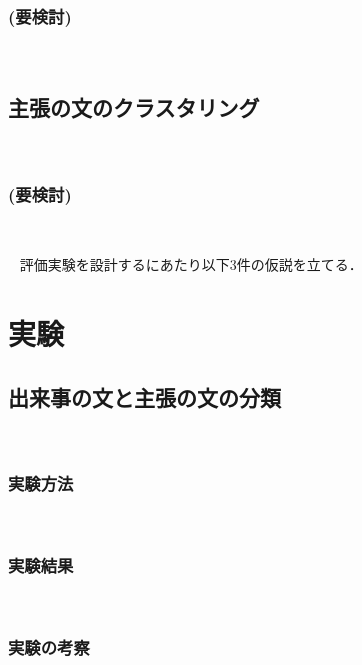 \documentclass[12pt,a4j]{jreport}
\begin{document}
\subsection{(要検討)}
~

\section{主張の文のクラスタリング}
~

\subsection{(要検討)}
~


~%
 評価実験を設計するにあたり以下3件の仮説を立てる．


\chapter{実験}


\section{出来事の文と主張の文の分類}
~

\subsection{実験方法}
~

\subsection{実験結果}
~

\subsection{実験の考察}
~
\end{document}
